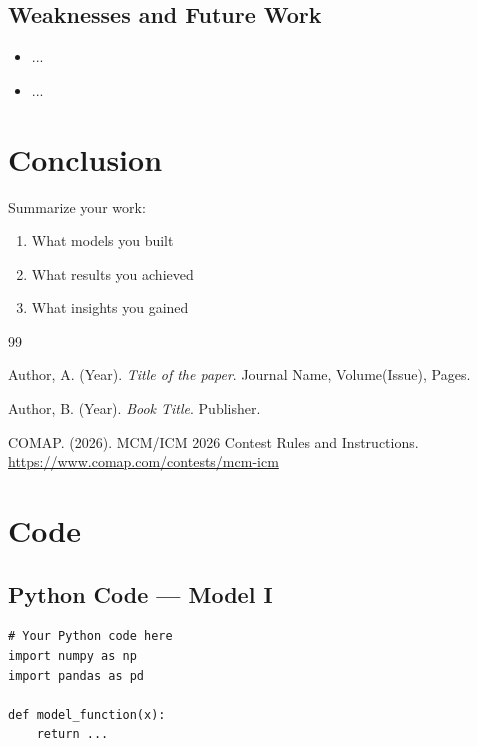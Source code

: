 \documentclass[12pt]{article}
\begin{document}
\subsection{Weaknesses and Future Work}
\begin{itemize}
    \item ...
    \item ...
\end{itemize}

\section{Conclusion}

Summarize your work:
\begin{enumerate}
    \item What models you built
    \item What results you achieved
    \item What insights you gained
\end{enumerate}

\begin{thebibliography}{99}

Author, A. (Year). \textit{Title of the paper}. Journal Name, Volume(Issue), Pages.

Author, B. (Year). \textit{Book Title}. Publisher.

COMAP. (2026). MCM/ICM 2026 Contest Rules and Instructions.
\url{https://www.comap.com/contests/mcm-icm}

\end{thebibliography}

\newpage
\appendix
\section{Code}

\subsection{Python Code — Model I}
\begin{verbatim}
# Your Python code here
import numpy as np
import pandas as pd

def model_function(x):
    return ...
\end{verbatim}
\end{document}
